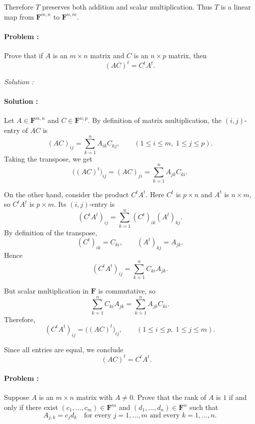 Therefore \(T\) preserves both addition and scalar multiplication.  
Thus \(T\) is a linear map from \(\mathbf{F}^{m,n}\) to \(\mathbf{F}^{n,m}\).

\paragraph{Problem :}
Prove that if \(A\) is an \(m \times n\) matrix and \(C\) is an \(n \times p\) matrix, then
\[
(AC)^t = C^t A^t.
\]

\vspace{4mm}
\textit{Solution :} 
\paragraph{Solution :}
Let \(A \in \mathbf{F}^{m,n}\) and \(C \in \mathbf{F}^{n,p}\).  
By definition of matrix multiplication, the \((i,j)\)-entry of \(AC\) is
\[
(AC)_{ij} = \sum_{k=1}^n A_{ik} C_{kj}, \qquad (1 \leq i \leq m, \; 1 \leq j \leq p).
\]
Taking the transpose, we get
\[
\big((AC)^t\big)_{ij} = (AC)_{ji} 
= \sum_{k=1}^n A_{jk} C_{ki}.
\]

On the other hand, consider the product \(C^t A^t\).  
Here \(C^t\) is \(p \times n\) and \(A^t\) is \(n \times m\), so \(C^t A^t\) is \(p \times m\).  
Its \((i,j)\)-entry is
\[
(C^t A^t)_{ij} = \sum_{k=1}^n (C^t)_{ik} (A^t)_{kj}.
\]
By definition of the transpose,
\[
(C^t)_{ik} = C_{ki}, \qquad (A^t)_{kj} = A_{jk}.
\]
Hence
\[
(C^t A^t)_{ij} = \sum_{k=1}^n C_{ki} A_{jk}.
\]

But scalar multiplication in \(\mathbf{F}\) is commutative, so
\[
\sum_{k=1}^n C_{ki} A_{jk} = \sum_{k=1}^n A_{jk} C_{ki}.
\]
Therefore,
\[
(C^t A^t)_{ij} = \big((AC)^t\big)_{ij}, \qquad (1 \leq i \leq p, \; 1 \leq j \leq m).
\]

Since all entries are equal, we conclude
\[
(AC)^t = C^t A^t. \quad 
\]

\paragraph{Problem :}
Suppose \(A\) is an \(m \times n\) matrix with \(A \neq 0\). Prove that the rank of \(A\) is \(1\) 
if and only if there exist \((c_{1}, \dots, c_{m}) \in \mathbf{F}^m\) and \((d_{1}, \dots, d_{n}) \in \mathbf{F}^n\) such that
\[
A_{j,k} = c_j d_k \quad \text{for every } j = 1, \dots, m \text{ and every } k = 1, \dots, n.
\]


